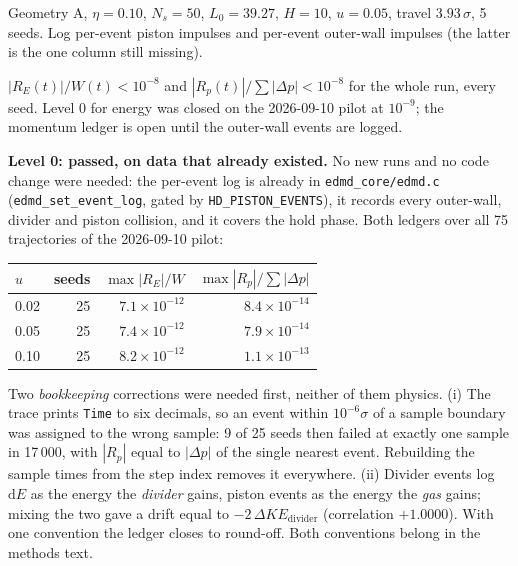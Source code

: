 \documentclass[11pt,a4paper]{article}
\newcommand{\dd}{\mathrm{d}}
\begin{document}
\begin{run}
Geometry A, $\eta = 0.10$, $N_s = 50$, $L_0 = 39.27$, $H = 10$, $u = 0.05$, travel $3.93\,\sigma$, 5 seeds. Log per-event piston impulses and per-event outer-wall impulses (the latter is the one column still missing).
\end{run}
\begin{pass}
$|R_E(t)|/W(t) < 10^{-8}$ and $|R_p(t)|/\sum|\Delta p| < 10^{-8}$ for the whole run, every seed. Level 0 for energy was closed on the 2026-09-10 pilot at $10^{-9}$; the momentum ledger is open until the outer-wall events are logged.
\end{pass}
\begin{res}
\textbf{Level 0: passed, on data that already existed.}
No new runs and no code change were needed: the per-event log is already in \texttt{edmd\_core/edmd.c} (\texttt{edmd\_set\_event\_log}, gated by \texttt{HD\_PISTON\_EVENTS}), it records every outer-wall, divider and piston collision, and it covers the hold phase. Both ledgers over all 75 trajectories of the 2026-09-10 pilot:

\begin{center}\footnotesize
\begin{tabular}{@{}lrrr@{}}
\toprule
$u$ & seeds & $\max|R_E|/W$ & $\max|R_p|/\sum|\Delta p|$\\
\midrule
0.02 & 25 & $7.1\times10^{-12}$ & $8.4\times10^{-14}$\\
0.05 & 25 & $7.4\times10^{-12}$ & $7.9\times10^{-14}$\\
0.10 & 25 & $8.2\times10^{-12}$ & $1.1\times10^{-13}$\\
\bottomrule
\end{tabular}
\end{center}

Two \emph{bookkeeping} corrections were needed first, neither of them physics. (i) The trace prints \texttt{Time} to six decimals, so an event within $10^{-6}\sigma$ of a sample boundary was assigned to the wrong sample: 9 of 25 seeds then failed at exactly one sample in 17\,000, with $|R_p|$ equal to $|\Delta p|$ of the single nearest event. Rebuilding the sample times from the step index removes it everywhere. (ii) Divider events log $\dd E$ as the energy the \emph{divider} gains, piston events as the energy the \emph{gas} gains; mixing the two gave a drift equal to $-2\,\Delta KE_{\mathrm{divider}}$ (correlation $+1.0000$). With one convention the ledger closes to round-off. Both conventions belong in the methods text.
\end{res}
\end{document}

